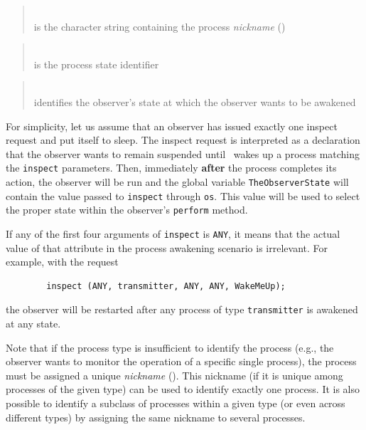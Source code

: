 \begin{quote}
\noindent{}\\ \hspace{0in}
is the character string containing the process {\em nickname}
()
\end{quote}

\begin{quote}
\noindent{}\\ \hspace{0in}
is the process state identifier
\end{quote}

\begin{quote}
\noindent{}\\ \hspace{0in}
identifies the observer's state at which the observer wants to be awakened
\end{quote}\medskip

For simplicity, let us assume that an observer has issued exactly
one inspect request and put itself to sleep.
The inspect request is interpreted as a declaration that the observer
wants to remain suspended until \smurph\ wakes up a
process matching the {\tt inspect} parameters.
Then, immediately {\bf after} the process completes its action, the
observer will be run and the global
variable {\tt TheObserverState} will contain the value passed to
{\tt inspect} through {\tt os}.
This value will be used to select the proper state within the
observer's {\tt perform} method.

If any of the first four arguments of {\tt inspect} is {\tt ANY},
it means that the actual value of that attribute in the process
awakening scenario is irrelevant.
For example, with the request
\begin{verbatim}
        inspect (ANY, transmitter, ANY, ANY, WakeMeUp);
\end{verbatim}
the observer will be restarted after any process of type {\tt transmitter}
is awakened at any state.

Note that if the process type is insufficient to identify the process (e.g.,
the observer wants to monitor the operation of a specific single process),
the process must be assigned a unique {\em nickname} ().
This nickname (if it is unique among processes of the given type) can
be used to identify exactly one process.
It is also possible to identify a subclass of processes within a given
type (or even across different types) by assigning the same nickname to
several processes.


